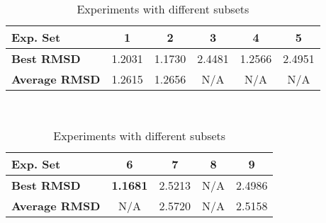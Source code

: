\begin{table}
	\centering
	\begin{tabular}{ | >{\bfseries}p{1.9cm} | c | c | c | c | c | }
		\hline
		Exp. Set & 1 & 2 & 3 & 4 & 5 \\ \hline
		Best RMSD & 1.2031 & 1.1730 & 2.4481 & 1.2566 & 2.4951 \\ \hline
		Average RMSD & 1.2615 & 1.2656 & N/A & N/A & N/A \\ \hline
	\end{tabular}
	\\
	\vspace{3 mm}
	\begin{tabular}{ | >{\bfseries}p{1.9cm} | c | c | c | c | }
		\hline
		Exp. Set & 6 & 7 & 8 & 9 \\ \hline
		Best RMSD & \textbf{1.1681} & 2.5213 & N/A & 2.4986 \\ \hline
		Average RMSD & N/A & 2.5720 & N/A & 2.5158 \\ \hline
	\end{tabular}
	\caption{Experiments with different subsets}
	\label{table:subset-results}
\end{table}

